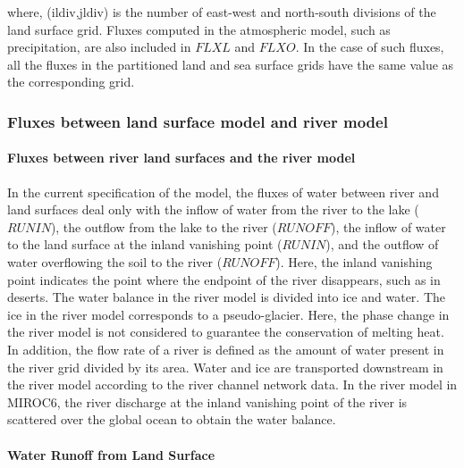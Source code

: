 where, (ildiv,jldiv) is the number of east-west and north-south
divisions of the land surface grid. Fluxes computed in the atmospheric
model, such as precipitation, are also included in \(FLXL\) and
\(FLXO\). In the case of such fluxes, all the fluxes in the partitioned
land and sea surface grids have the same value as the corresponding
grid.

\hypertarget{fluxes-between-land-surface-model-and-river-model}{%
\subsubsection{Fluxes between land surface model and river
model}\label{fluxes-between-land-surface-model-and-river-model}}

\hypertarget{fluxes-between-river-land-surfaces-and-the-river-model}{%
\paragraph{Fluxes between river land surfaces and the river
model}\label{fluxes-between-river-land-surfaces-and-the-river-model}}

In the current specification of the model, the fluxes of water between
river and land surfaces deal only with the inflow of water from the
river to the lake (\(RUNIN\)), the outflow from the lake to the river
(\(RUNOFF\)), the inflow of water to the land surface at the inland
vanishing point (\(RUNIN\)), and the outflow of water overflowing the
soil to the river (\(RUNOFF\)). Here, the inland vanishing point
indicates the point where the endpoint of the river disappears, such as
in deserts. The water balance in the river model is divided into ice and
water. The ice in the river model corresponds to a pseudo-glacier. Here,
the phase change in the river model is not considered to guarantee the
conservation of melting heat. In addition, the flow rate of a river is
defined as the amount of water present in the river grid divided by its
area. Water and ice are transported downstream in the river model
according to the river channel network data. In the river model in
MIROC6, the river discharge at the inland vanishing point of the river
is scattered over the global ocean to obtain the water balance.

\hypertarget{water-runoff-from-land-surface}{%
\paragraph{Water Runoff from Land
Surface}\label{water-runoff-from-land-surface}}

